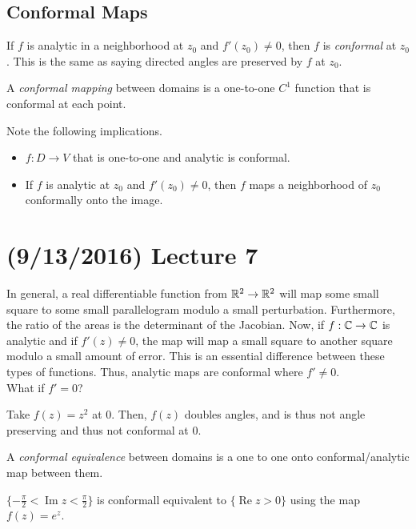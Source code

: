 \documentclass[11pt,leqno,oneside]{amsart}
\renewcommand{\Re}{\operatorname{Re}}
\renewcommand{\Im}{\operatorname{Im}}
\begin{document}
\subsection*{Conformal Maps}
\begin{defn}
    If $f$ is analytic in a neighborhood at $z_0$ and $f'(z_0) \neq 0$, then
    $f$ is \emph{conformal} at $z_0$. This is the same as saying directed
    angles are preserved by $f$ at $z_0$.
\end{defn}
\begin{defn}
    A \emph{conformal mapping} between domains is a one-to-one $C^1$ function
    that is conformal at each point.
\end{defn}
Note the following implications.
\begin{itemize}
    \item $f: D \to V$ that is one-to-one and analytic is conformal.
    \item If $f$ is analytic at $z_0$ and $f'(z_0) \neq 0$, then $f$ maps a
        neighborhood of $z_0$ conformally onto the image.
\end{itemize}

\section{(9/13/2016) Lecture 7}
In general, a real differentiable function from ${\mathbb R}^2 \to {\mathbb R}^2$ will map some
small square to some small parallelogram modulo a small
perturbation. Furthermore, the ratio of the areas is the determinant of the
Jacobian. Now, if $f: {\mathbb C} \to {\mathbb C}$ is analytic and if $f'(z) \neq 0$, the map will
map a small square to another square modulo a small amount of error. This is an
essential difference between these types of functions. Thus, analytic maps are
conformal where $f' \neq 0$. \\

What if $f' = 0$?
\begin{example}
  Take $f(z) = z^2$ at 0. Then, $f(z)$ doubles angles, and is thus not angle
  preserving and thus not conformal at 0.
\end{example}

\begin{defn}
  A \emph{conformal equivalence} between domains is a one to one onto
  conformal/analytic map between them.
\end{defn}
\begin{example}
  $\{-\frac{\pi}{2} < \Im z < \frac{\pi}{2}\}$ is conformall equivalent to
  $\{\Re z > 0\}$ using the map $f(z) = e^z$.
\end{example}
\end{document}
